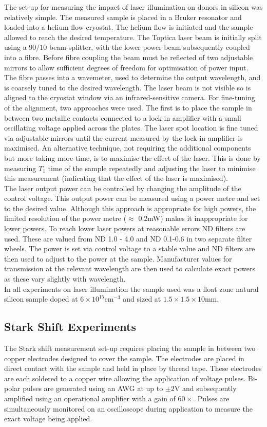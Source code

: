 The set-up for measuring the impact of laser illumination on donors in silicon was relatively simple.
The measured sample is placed in a Bruker resonator and loaded into a helium flow cryostat.
The helium flow is initiated and the sample allowed to reach the desired temperature.
The Toptica laser beam is initially split using a $90/10$ beam-splitter, with the lower power beam subsequently coupled into a fibre.
Before fibre coupling the beam must be reflected of two adjustable mirrors to allow sufficient degrees of freedom for optimisation of power input.
The fibre passes into a wavemeter, used to determine the output wavelength, and is coarsely tuned to the desired wavelength.
The laser beam is not visible so is aligned to the cryostat window via an infrared-sensitive camera.
For fine-tuning of the alignment, two approaches were used.
The first is to place the sample in between two metallic contacts connected to a lock-in amplifier with a small oscillating voltage applied across the plates.
The laser spot location is fine tuned via adjustable mirrors until the current measured by the lock-in amplifier is maximised.
An alternative technique, not requiring the additional components but more taking more time, is to maximise the effect of the laser.
This is done by measuring $T_1$ time of the sample repeatedly and adjusting the laser to minimise this measurement (indicating that the effect of the laser is maximised). 
\\
The laser output power can be controlled by changing the amplitude of the control voltage.
This output power can be measured using a power metre and set to the desired value.
Although this approach is appropriate for high powers, the limited resolution of the power metre ($\approx$ 0.2mW) makes it inappropriate for lower powers.
To reach lower laser powers at reasonable errors ND filters are used.
These are valued from ND 1.0 - 4.0 and ND 0.1-0.6 in two separate filter wheels.
The power is set via control voltage to a stable value and ND filters are then used to adjust to the power at the sample.
Manufacturer values for transmission at the relevant wavelength are then used to calculate exact powers as these vary slightly with wavelength.
\\
In all experiments on laser illumination the sample used was a float zone natural silicon sample doped at $6\times10^{15}\text{cm}^{-3}$ and sized at $1.5\times1.5\times10$mm.

\subsection{Stark Shift Experiments}

The Stark shift measurement set-up requires placing the sample in between two copper electrodes designed to cover the sample.
The electrodes are placed in direct contact with the sample and held in place by thread tape.
These electrodes are each soldered to a copper wire allowing the application of voltage pulses.
Bi-polar pulses are generated using an AWG at up to $\pm2$V and subsequently amplified using an operational amplifier with a gain of $60\times$.
Pulses are simultaneously monitored on an oscilloscope during application to measure the exact voltage being applied.


